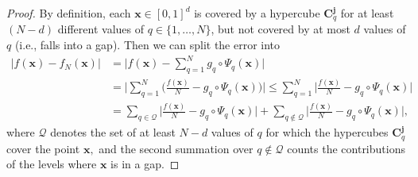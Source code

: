 \documentclass[10pt,a4paper]{amsart}
\newcommand{\bs}[1]{\boldsymbol{#1}}
\begin{document}
\begin{proof} 
By definition,  each $\bs x\in [0,1]^d$ is covered by a hypercube   
$\bs C_q^{\bs j}$ for  at least $(N-d)$ different values of $q\in\{1,\ldots, N\}$, but not covered by at most $d$ values of $q$ (i.e., falls into a gap). 
Then we can split the error into 
\begin{equation}\label{ffNas}
\begin{aligned}
|f(\bs x)-f_N(\bs x)|& = \Big|f(\bs{x})-\sum_{q=1}^N g_q\circ\Psi_q(\bs{x})\Big|\\
& =
\Big|\sum_{q=1}^N \Big(\frac {f(\bs{x})} N- g_q\circ\Psi_q(\bs{x})\Big)\Big| \leq \sum_{q=1}^N\Big|\frac{f(\bs x)}{N}-g_q\circ\Psi_q(\bs x)\Big| \\
& =  \sum_{q\in {\mathcal Q}}\Big|\frac{f(\bs x)}{N}-g_q\circ\Psi_q(\bs x)\Big|+\sum_{q\not\in {\mathcal Q}}\Big|\frac{f(\bs x)}{N}-g_q\circ\Psi_q(\bs x)\Big|,
\end{aligned}
\end{equation}
where  ${\mathcal Q}$ denotes the set of at least $N-d$ values of $q$ for which the hypercubes $\bs C_q^{\bs{j}}$ cover the point $\bs x,$ and the second summation over $q\not\in {\mathcal Q}$ counts the contributions of the levels where $\bs x$ is in a gap.  


\end{proof}
\end{document}
